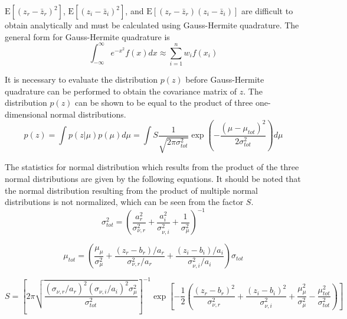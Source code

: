 \documentclass{article}         %
\theoremstyle{definition}
\theoremstyle{remark}
\begin{document}
$\mathrm{E}\left[\left(z_r - \bar{z}_r\right)^2\right]$, $\mathrm{E}\left[\left(z_i - \bar{z}_i\right)^2\right]$, and $\mathrm{E}\left[\left(z_r - \bar{z}_r\right)\left(z_i - \bar{z}_i\right)\right]$ are difficult to obtain analytically and must be calculated using Gauss-Hermite quadrature. The general form for Gauss-Hermite quadrature is
\begin{equation}
	\int_{-\infty}^{\infty}e^{-x^2}f\left(x\right)dx \approx \sum_{i=1}^n w_if\left(x_i\right)
\end{equation}

It is necessary to evaluate the distribution $p\left(z\right)$ before Gauss-Hermite quadrature can be performed to obtain the covariance matrix of $z$. The distribution $p\left(z\right)$ can be shown to be equal to the product of three one-dimensional normal distributions.
\begin{equation}
	p\left(z\right) = \int p\left(z|\mu\right)p\left(\mu\right)d\mu = \int S\frac{1}{\sqrt{2\pi\sigma_{tot}^2}}\exp\left(-\frac{\left(\mu - \mu_{tot}\right)^2}{2\sigma_{tot}^2}\right)d\mu
\end{equation}

The statistics for normal distribution which results from the product of the three normal distributions are given by the following equations. It should be noted that the normal distribution resulting from the product of multiple normal distributions is not normalized, which can be seen from the factor $S$.
\begin{equation}
	\sigma_{tot}^2 = \left(\frac{a_r^2}{\sigma_{\nu,r}^2} + \frac{a_i^2}{\sigma_{\nu,i}^2} + \frac{1}{\sigma_\mu^2}\right)^{-1}
\end{equation}

\begin{equation}
	\mu_{tot} = \left(\frac{\mu_\mu}{\sigma_\mu^2} + \frac{\left(z_r - b_r\right)/a_r}{\sigma_{\nu,r}^2/a_r} + \frac{\left(z_i - b_i\right)/a_i}{\sigma_{\nu,i}^2/a_i}\right)\sigma_{tot}
\end{equation}

\begin{equation}
	S = \left[2\pi\sqrt{\frac{\left(\sigma_{\nu,r}/a_r\right)^2\left(\sigma_{\nu,i}/a_i\right)^2\sigma_\mu^2}{\sigma_{tot}^2}}\right]^{-1}\exp\left[-\frac{1}{2}\left(\frac{\left(z_r - b_r\right)^2}{\sigma_{\nu,r}^2} + \frac{\left(z_i - b_i\right)^2}{\sigma_{\nu,i}^2} + \frac{\mu_\mu^2}{\sigma_\mu^2} - \frac{\mu_{tot}^2}{\sigma_{tot}^2}\right)\right]
\end{equation}
\end{document}
